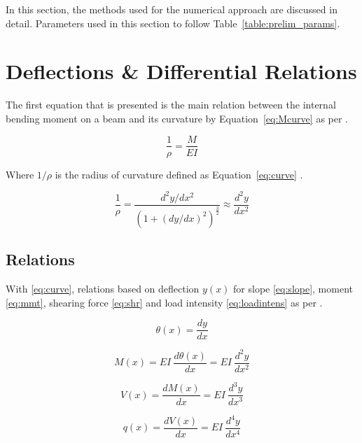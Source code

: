 \label{chapt:prelim}

In this section, the methods used for the numerical approach are discussed in detail. Parameters used in this section to follow Table~\ref{table:prelim_params}.

\section{Deflections \& Differential Relations}

The first equation that is presented is the main relation between the internal bending moment on a beam and its curvature by Equation~\ref{eq:Mcurve} as per \cite{nisbett2014shigley}. 

\begin{equation}
	\label{eq:Mcurve}
	\frac{1}{\rho}=\frac{M}{EI}
\end{equation}

Where $1/\rho$ is the radius of curvature defined as Equation~\ref{eq:curve} \cite{nisbett2014shigley}.

\begin{equation}
	\label{eq:curve}
	\frac{1}{\rho}=\frac{d^2y/dx^2}{\left( 1 +(dy/dx)^2 \right)^\frac{3}{2}} \approx \frac{d^2y}{dx^2}
\end{equation}

\subsection{Relations}

With \ref{eq:curve}, relations based on deflection $y(x)$ for slope \ref{eq:slope}, moment \ref{eq:mmt}, shearing force \ref{eq:shr} and load intensity \ref{eq:loadintens} as per \cite{nisbett2014shigley}.

\begin{equation}
	\label{eq:slope}
	\theta(x) = \frac{dy}{dx}
\end{equation}

\begin{equation}
	\label{eq:mmt}
	M(x) = EI\ \frac{d\theta(x)}{dx} = EI\ \frac{d^2y}{dx^2}
\end{equation}

\begin{equation}
	\label{eq:shr}
	V(x) = \frac{dM(x)}{dx} = EI\ \frac{d^3y}{dx^3}
\end{equation}

\begin{equation}
	\label{eq:loadintens}
	q(x) = \frac{dV(x)}{dx} = EI\ \frac{d^4y}{dx^4}
\end{equation}

